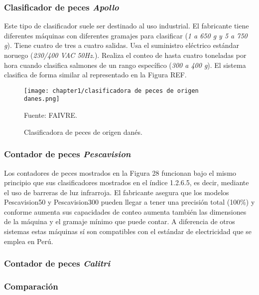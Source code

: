 \subsubsection{Clasificador de peces \textit{Apollo}}

Este tipo de clasificador suele ser destinado al uso industrial. El fabricante tiene diferentes máquinas con diferentes gramajes para clasificar (\textit{1 a 650 g y 5 a 750 g}). Tiene cuatro de tres a cuatro salidas. Usa el suministro eléctrico estándar noruego (\textit{230/400 VAC 50Hz.}). Realiza el conteo de hasta cuatro toneladas por hora cuando clasifica salmones de un rango específico (\textit{300 a 400 g}). El sistema clasifica de forma similar al representado en la Figura REF. \cite{Apollo2013}

\begin{figure}[H]
	\centering
	\texttt{[image: chapter1/clasificadora de peces de origen danes.png]}
	\caption{Clasificadora de peces de origen danés.}
	Fuente: FAIVRE.
	\label{fig:clasificadora de peces de origen danes}
\end{figure}

\subsubsection{Contador de peces \textit{Pescavision}}

Los contadores de peces mostrados en la Figura 28 funcionan bajo el mismo principio que sus clasificadores mostrados en el índice 1.2.6.5, es decir, mediante el uso de barreras de luz infrarroja. El fabricante asegura que los modelos Pescavision50 y Pescavision300 pueden llegar a tener una precisión total (100\%) y conforme aumenta sus capacidades de conteo aumenta también las dimensiones de la máquina y el gramaje mínimo que puede contar. A diferencia de otros sistemas estas máquinas sí son compatibles con el estándar de electricidad que se emplea en Perú.

\subsubsection{Contador de peces \textit{Calitri}}

\subsubsection{Comparación}



